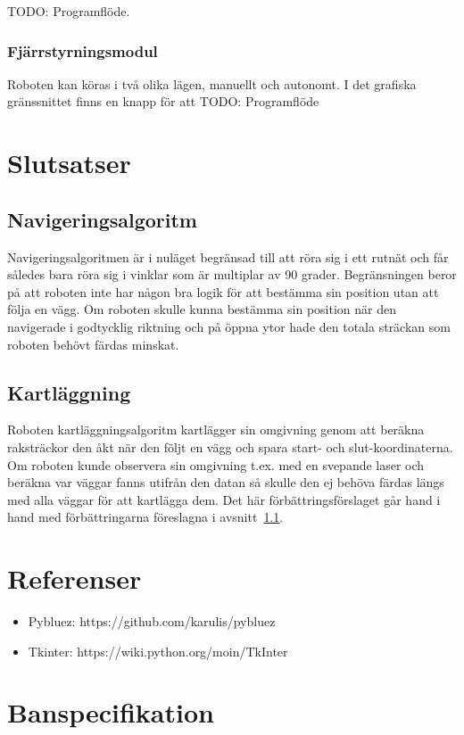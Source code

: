 \documentclass{article}
\begin{document}
TODO: Programflöde.

\subsubsection{Fjärrstyrningsmodul}
Roboten kan köras i två olika lägen, manuellt och autonomt. I det grafiska gränssnittet finns en knapp för att 
TODO: Programflöde

\clearpage
\section{Slutsatser}

\subsection{Navigeringsalgoritm}
\label{sec:slutsatser_navigering}
Navigeringsalgoritmen är i nuläget begränsad till att röra sig i ett rutnät och får således bara röra sig i vinklar som är multiplar av 90 grader. Begränsningen beror på att roboten inte har någon bra logik för att bestämma sin position utan att följa en vägg. Om roboten skulle kunna bestämma sin position när den navigerade i godtycklig riktning och på öppna ytor hade den totala sträckan som roboten behövt färdas minskat.

\subsection{Kartläggning}
Roboten kartläggningsalgoritm kartlägger sin omgivning genom att beräkna raksträckor den åkt när den följt en vägg och spara start- och slut-koordinaterna. Om roboten kunde observera sin omgivning t.ex. med en svepande laser och beräkna var väggar fanns utifrån den datan så skulle den ej behöva färdas längs med alla väggar för att kartlägga dem. Det här förbättringsförslaget går hand i hand med förbättringarna föreslagna i avsnitt~\ref{sec:slutsatser_navigering}.

\clearpage
\section{Referenser}
\begin{itemize}
    \item Pybluez: https://github.com/karulis/pybluez
    \item Tkinter: https://wiki.python.org/moin/TkInter
\end{itemize}

\appendix
\clearpage
\section{Banspecifikation}
\label{sec:banspec}

\end{document}
